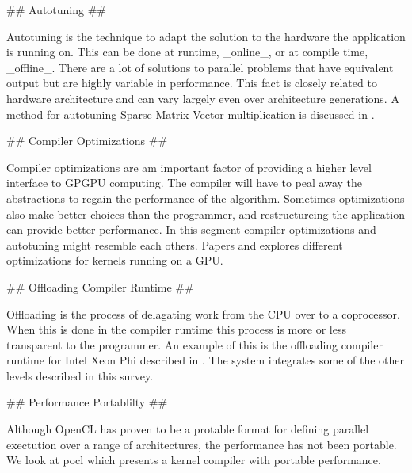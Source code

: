 \begin{markdown}
## Autotuning ##

Autotuning is the technique to adapt the solution to the hardware the
application is running on. This can be done at runtime, _online_, or
at compile time, _offline_. There are a lot of solutions to parallel
problems that have equivalent output but are highly variable in
performance. This fact is closely related to hardware architecture and
can vary largely even over architecture generations. A method for
autotuning Sparse Matrix-Vector multiplication is discussed in
\cite{auto}.


## Compiler Optimizations ##

Compiler optimizations are am important factor of providing a higher
level interface to GPGPU computing. The compiler will have to peal
away the abstractions to regain the performance of the
algorithm. Sometimes optimizations also make better choices than
the programmer, and restructureing the application can provide better
performance. In this segment compiler optimizations and autotuning
might resemble each others. Papers \cite{thd-coa} and \cite{mem-acc}
explores different optimizations for kernels running on a GPU.  

## Offloading Compiler Runtime ##

Offloading is the process of delagating work from the CPU over to a
coprocessor. When this is done in the compiler runtime this process is
more or less transparent to the programmer. An example of this is the
offloading compiler runtime for Intel Xeon Phi described in
\cite{phi}. The system integrates some of the other levels described
in this survey.

## Performance Portablilty ##

Although OpenCL has proven to be a protable format for defining
parallel exectution over a range of architectures, the performance has
not been portable. We look at pocl \cite{pocl} which presents a kernel
compiler with portable performance.



\end{markdown}


